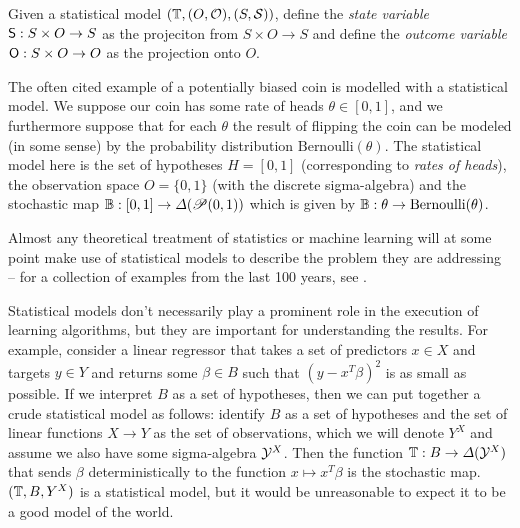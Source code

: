 \begin{definition}\label{def:state_outcome}
Given a statistical model $(\mathbb{T},(O,\mathcal{O}),(S,\mathcal{S}))$, define the \emph{state variable} $\mathsf{S}:S\times O\to S$ as the projeciton from $S\times O\to S$ and define the \emph{outcome variable} $\mathsf{O}:S\times O\to O$ as the projection onto $O$.
\end{definition}

The often cited example of a potentially biased coin is modelled with a statistical model. We suppose our coin has some rate of heads $\theta\in [0,1]$, and we furthermore suppose that for each $\theta$ the result of flipping the coin can be modeled (in some sense) by the probability distribution $\text{Bernoulli}(\theta)$. The statistical model here is the set of hypotheses $H=[0,1]$ (corresponding to \emph{rates of heads}), the observation space $O=\{0,1\}$ (with the discrete sigma-algebra) and the stochastic map $\mathbb{B}:[0,1]\to \Delta(\mathscr{P}(0,1))$ which is given by $\mathbb{B}:\theta\to \text{Bernoulli}(\theta)$.

Almost any theoretical treatment of statistics or machine learning will at some point make use of statistical models to describe the problem they are addressing -- for a collection of examples from the last 100 years, see \cite{Goodfellow-et-al-2016,vapnik_nature_2013,bishop_pattern_2006,le_cam_comparison_1996,freedman_asymptotic_1963,wald_statistical_1950,de_finetti_foresight_1992,fisher_statistical_1992}. 

Statistical models don't necessarily play a prominent role in the execution of learning algorithms, but they are important for understanding the results. For example, consider a linear regressor that takes a set of predictors $x\in X$ and targets $y\in Y$ and returns some $\beta\in B$ such that $(y-x^T\beta)^2$ is as small as possible. If we interpret $B$ as a set of hypotheses, then we can put together a crude statistical model as follows: identify $B$ as a set of hypotheses and the set of linear functions $X\to Y$ as the set of observations, which we will denote $Y^X$ and assume we also have some sigma-algebra $\mathcal{Y}^X$. Then the function $\mathbb{T}:B\to \Delta(\mathcal{Y}^X)$ that sends $\beta$ deterministically to the function $x\mapsto x^T\beta$ is the stochastic map. $(\mathbb{T},B,Y^X)$ is a statistical model, but it would be unreasonable to expect it to be a good model of the world.

